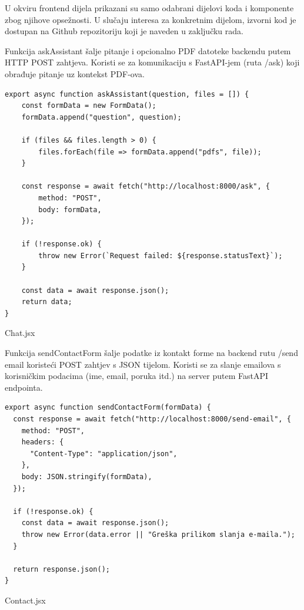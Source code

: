 \documentclass[]{foi}
\begin{document}
U okviru frontend dijela prikazani su samo odabrani dijelovi koda i komponente zbog njihove opsežnosti. U slučaju interesa za konkretnim dijelom, izvorni kod je dostupan na Github 
repozitoriju koji je naveden u zaključku rada.

Funkcija askAssistant šalje pitanje i opcionalno PDF datoteke backendu putem HTTP POST zahtjeva. Koristi se za komunikaciju s FastAPI-jem
(ruta /ask) koji obrađuje pitanje uz kontekst PDF-ova.

\begin{longlisting}
\begin{verbatim}
export async function askAssistant(question, files = []) {
    const formData = new FormData();
    formData.append("question", question);

    if (files && files.length > 0) {
        files.forEach(file => formData.append("pdfs", file));
    }

    const response = await fetch("http://localhost:8000/ask", {
        method: "POST",
        body: formData,
    });

    if (!response.ok) {
        throw new Error(`Request failed: ${response.statusText}`);
    }

    const data = await response.json();
    return data;
}
\end{verbatim}
\caption{Chat.jsx}
\label{lst:chat}
\end{longlisting}

Funkcija sendContactForm šalje podatke iz kontakt forme na backend rutu /send email koristeći POST zahtjev s JSON tijelom.
Koristi se za slanje emailova s korisničkim podacima (ime, email, poruka itd.) na server putem FastAPI endpointa.


\begin{longlisting}
\begin{verbatim}
export async function sendContactForm(formData) {
  const response = await fetch("http://localhost:8000/send-email", {
    method: "POST",
    headers: {
      "Content-Type": "application/json",
    },
    body: JSON.stringify(formData),
  });

  if (!response.ok) {
    const data = await response.json();
    throw new Error(data.error || "Greška prilikom slanja e-maila.");
  }

  return response.json();
}
\end{verbatim}
\caption{Contact.jsx}
\label{lst:contact}
\end{longlisting}
\end{document}
